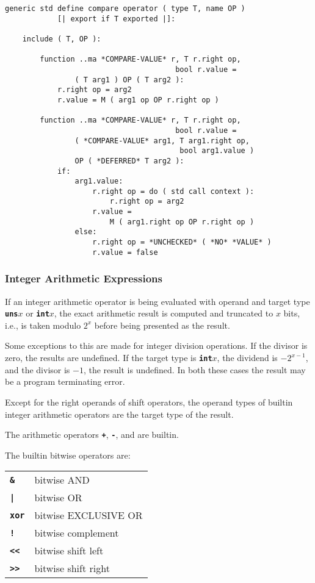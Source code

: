 \documentclass[12pt]{article}
\newcommand{\TT}[1]{{\tt \bfseries #1}}
\newenvironment{indpar}[1][0.3in]%
	{\begin{list}{}%
		     {\setlength{\itemsep}{0in}%
		      \setlength{\topsep}{0in}%
		      \setlength{\parsep}{1ex}%
		      \setlength{\labelwidth}{#1}%
		      \setlength{\leftmargin}{#1}%
		      \addtolength{\leftmargin}{\labelsep}}%
	 \item}%
	{\end{list}}
\begin{document}
\label{DEFINE-COMPARE-OPERATOR}%
\begin{indpar}\begin{verbatim}
generic std define compare operator ( type T, name OP )
            [| export if T exported |]:

    include ( T, OP ):

        function ..ma *COMPARE-VALUE* r, T r.right op,
                                       bool r.value =
                ( T arg1 ) OP ( T arg2 ):
            r.right op = arg2
            r.value = M ( arg1 op OP r.right op )

        function ..ma *COMPARE-VALUE* r, T r.right op,
                                       bool r.value =
                ( *COMPARE-VALUE* arg1, T arg1.right op,
                                        bool arg1.value )
                OP ( *DEFERRED* T arg2 ):
            if:
                arg1.value:
                    r.right op = do ( std call context ):
                        r.right op = arg2
                    r.value =
                        M ( arg1.right op OP r.right op )
                else:
                    r.right op = *UNCHECKED* ( *NO* *VALUE* )
                    r.value = false
\end{verbatim}\end{indpar}

\subsubsection{Integer Arithmetic Expressions}

If an integer arithmetic operator is being evaluated with
operand and target type \TT{uns$x$} or \TT{int$x$}, the
exact arithmetic result is computed and truncated to
$x$ bits, i.e., is taken modulo $2^x$ before being presented
as the result.

Some exceptions to this are made for integer division operations.
If the divisor is zero, the results are undefined.  If the
target type is \TT{int$x$}, the dividend is $-2^{x-1}$, and
the divisor is $-1$, the result is undefined.  In both these
cases the result may be a program terminating error.

Except for the right operands of
shift operators, the operand types of builtin
integer arithmetic operators are the target type of the result.

The arithmetic operators \TT{+}, \TT{-}, and \TT{*} are builtin.

The builtin bitwise operators are:
\begin{center}
\begin{tabular}{ll}
\TT{\&}		& bitwise AND \\
\TT{|}		& bitwise OR \\
\TT{xor}	& bitwise EXCLUSIVE OR \\
\TT{!}		& bitwise complement \\
\TT{<{}<}	& bitwise shift left \\
\TT{>{}>}	& bitwise shift right \\
\end{tabular}
\end{center}
\end{document}
